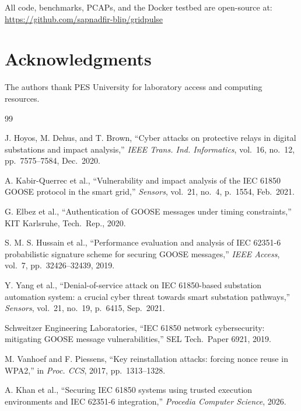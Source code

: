 \documentclass[11pt,a4paper,twocolumn]{article}
\begin{document}
All code, benchmarks, PCAPs, and the Docker testbed are open-source at: \url{https://github.com/sapnadfir-blip/gridpulse}

\section*{Acknowledgments}

The authors thank PES University for laboratory access and computing resources.

\begin{thebibliography}{99}
\scriptsize

J. Hoyos, M. Dehus, and T. Brown, ``Cyber attacks on protective relays in digital substations and impact analysis,'' \textit{IEEE Trans. Ind. Informatics}, vol.~16, no.~12, pp.~7575--7584, Dec.~2020.

A. Kabir-Querrec et al., ``Vulnerability and impact analysis of the IEC 61850 GOOSE protocol in the smart grid,'' \textit{Sensors}, vol.~21, no.~4, p.~1554, Feb.~2021.

G. Elbez et al., ``Authentication of GOOSE messages under timing constraints,'' KIT Karlsruhe, Tech.\ Rep., 2020.

S. M. S. Hussain et al., ``Performance evaluation and analysis of IEC 62351-6 probabilistic signature scheme for securing GOOSE messages,'' \textit{IEEE Access}, vol.~7, pp.~32426--32439, 2019.

Y. Yang et al., ``Denial-of-service attack on IEC 61850-based substation automation system: a crucial cyber threat towards smart substation pathways,'' \textit{Sensors}, vol.~21, no.~19, p.~6415, Sep.~2021.

Schweitzer Engineering Laboratories, ``IEC 61850 network cybersecurity: mitigating GOOSE message vulnerabilities,'' SEL Tech.\ Paper 6921, 2019.

M. Vanhoef and F. Piessens, ``Key reinstallation attacks: forcing nonce reuse in WPA2,'' in \textit{Proc. CCS}, 2017, pp.~1313--1328.

A. Khan et al., ``Securing IEC 61850 systems using trusted execution environments and IEC 62351-6 integration,'' \textit{Procedia Computer Science}, 2026.

\end{thebibliography}
\end{document}
